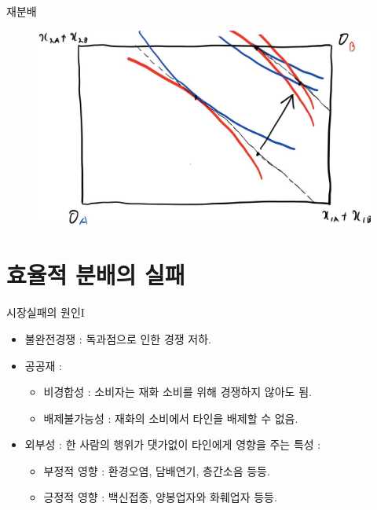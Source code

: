 \documentclass[aspectratio=169,xcolor=dvipsnames,handout]{beamer}
\begin{document}
\begin{frame}{재분배}
    \begin{figure}
        \centering
        \includegraphics[scale=.3]{pic/trans4.jpg}
    \end{figure}
\end{frame}

\section{효율적 분배의 실패}

\begin{frame}{시장실패의 원인I}
    \begin{itemize}
        \begin{alertblock}{완전경쟁시장 }
        무수히 많은 생산자와 소비자가 존재하여 어떤 참여자도 가격에 영향을 줄 수 없는 상태의 시장.
        \end{alertblock}
        \item 불완전경쟁 : 독과점으로 인한 경쟁 저하.
        \item 공공재 :
        \begin{itemize}
            \item 비경합성 : 소비자는 재화 소비를 위해 경쟁하지 않아도 됨.
            \item 배제불가능성 : 재화의 소비에서 타인을 배제할 수 없음.
        \end{itemize}
        \item 외부성 : 한 사람의 행위가 댓가없이 타인에게 영향을 주는 특성 :
        \begin{itemize}
            \item 부정적 영향 : 환경오염, 담배연기, 층간소음 등등.
            \item 긍정적 영향 : 백신접종, 양봉업자와 화훼업자 등등.
        \end{itemize}
    \end{itemize}
\end{frame}
\end{document}
